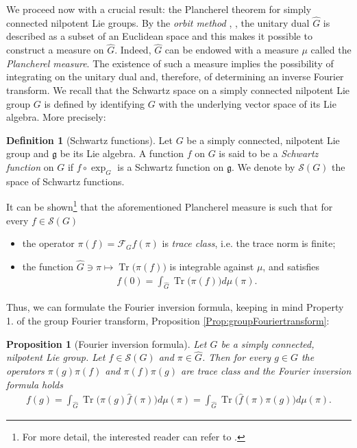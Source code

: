 \documentclass[12pt,oneside,a4paper]{book}
\numberwithin{equation}{section}     %
\theoremstyle{plain}
\newtheorem{proposition}[theorem]{Proposition}
\theoremstyle{definition}
\newtheorem{definition}[theorem]{Definition}
\DeclareMathOperator{\Tr}{Tr}
\begin{document}
We proceed now with a crucial result: the Plancherel theorem for simply connected nilpotent Lie groups. By the \textit{orbit method} \cite[Section 1.8.1]{FR2016}, \cite{CG90}, the unitary dual $\widehat{G}$ is described as a subset of an Euclidean space and this makes it possible to construct a measure on $\widehat{G}$. Indeed, $\widehat{G}$ can be endowed with a measure $\mu$ called the \textit{Plancherel measure}. The existence of such a measure implies the possibility of integrating on the unitary dual and, therefore, of determining an inverse Fourier transform.  
We recall that the Schwartz space on a simply connected nilpotent Lie group $G$ is defined by identifying $G$ with the underlying vector space of its Lie algebra. More precisely:
\begin{definition}[Schwartz functions]
	Let $G$ be a simply connected, nilpotent Lie group and $\mathfrak{g}$ be its Lie algebra. A function $f$ on $G$ is said to be a \textit{Schwartz function} on $G$ if $f\circ \exp_{G}$ is a Schwartz function on $\mathfrak{g}$. We denote by $\mathcal{S}(G)$ the space of Schwartz functions. 
\end{definition}
It can be shown\footnote{For more detail, the interested reader can refer to \cite[Section 4.2 and 4.3, Theorem 4.3.9]{CG90}.} that the aforementioned Plancherel measure is such that for every $f\in \mathcal{S}(G)$
\begin{itemize}
	\item the operator $\pi(f)=\mathcal{F}_Gf(\pi)$ is \textit{trace class}, i.e. the trace norm is finite;
	\item the function $\widehat{G}\ni\pi\mapsto \Tr\big(\pi(f)\big)$ is integrable against $\mu$, and satisfies
	\begin{align*}
	f(0)=\int_{\widehat{G}}\Tr\big(\pi(f)\big)d\mu(\pi).
	\end{align*}
\end{itemize}
Thus, we can formulate the Fourier inversion formula, keeping in mind Property 1. of the group Fourier transform, Proposition \ref{Prop:groupFouriertransform}:
\begin{proposition}[Fourier inversion formula]
	Let $G$ be a simply connected, nilpotent Lie group. Let $f\in\mathcal{S}(G)$ and $\pi\in\widehat{G}$. Then for every $g\in G$ the operators $\pi(g)\pi(f)$ and $\pi(f)\pi(g)$ are trace class and the Fourier inversion formula holds
	\begin{align*}
	f(g)=\int_{\widehat{G}}\Tr\big(\pi(g)\widehat{f}(\pi)\big)d\mu(\pi)=\int_{\widehat{G}}\Tr\big(\widehat{f}(\pi)\pi(g)\big)d\mu(\pi).
	\end{align*}
\end{proposition}
\end{document}

